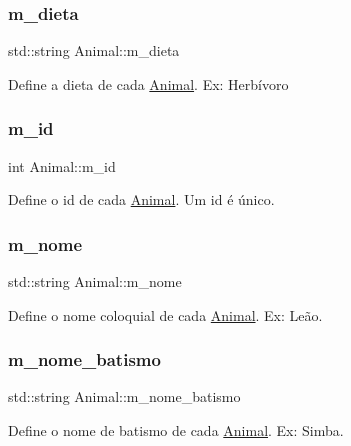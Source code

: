 \subsubsection{\texorpdfstring{m\+\_\+dieta}{m\_dieta}}
{\footnotesize\ttfamily std\+::string Animal\+::m\+\_\+dieta\hspace{0.3cm}{\ttfamily [protected]}}

Define a dieta de cada \hyperlink{classAnimal}{Animal}. Ex\+: Herbívoro \mbox{\label{classAnimal_a1a39448480e098fc74b5b67c4921a5ec}} 
\subsubsection{\texorpdfstring{m\+\_\+id}{m\_id}}
{\footnotesize\ttfamily int Animal\+::m\+\_\+id\hspace{0.3cm}{\ttfamily [protected]}}

Define o id de cada \hyperlink{classAnimal}{Animal}. Um id é único. \mbox{\label{classAnimal_adea60068908c590e8f92b2680023f8ce}} 
\subsubsection{\texorpdfstring{m\+\_\+nome}{m\_nome}}
{\footnotesize\ttfamily std\+::string Animal\+::m\+\_\+nome\hspace{0.3cm}{\ttfamily [protected]}}

Define o nome coloquial de cada \hyperlink{classAnimal}{Animal}. Ex\+: Leão. \mbox{\label{classAnimal_aa9717b7e2de07af7118050ca1c10d0b5}} 
\subsubsection{\texorpdfstring{m\+\_\+nome\+\_\+batismo}{m\_nome\_batismo}}
{\footnotesize\ttfamily std\+::string Animal\+::m\+\_\+nome\+\_\+batismo\hspace{0.3cm}{\ttfamily [protected]}}

Define o nome de batismo de cada \hyperlink{classAnimal}{Animal}. Ex\+: Simba. \mbox{\label{classAnimal_af90a04b32166b6815617cfd4033da1e4}} 
